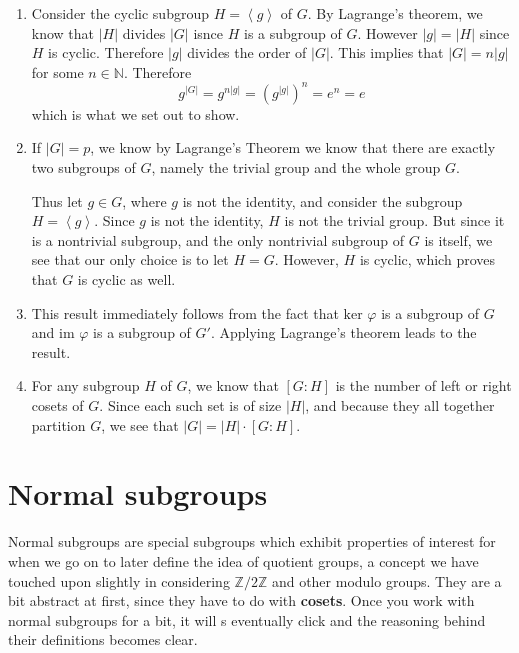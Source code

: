 \documentclass[12pt,letterpaper]{algebra_book}
\renewcommand{\phi}{\varphi}
\theoremstyle{definition}
\begin{document}
    \begin{prf}
        \begin{enumerate}
            \item Consider the cyclic subgroup $H = \left<g\right>$ of $G$. By
            Lagrange's theorem, we know that $|H|$ divides $|G|$ isnce
            $H$ is a subgroup of $G$. However $|g| = |H|$ since $H$ is
            cyclic. Therefore $|g|$ divides the order of $|G|$. This
            implies that $|G| = n|g|$ for some $n \in \mathbb{N}$.
            Therefore 
            \[
                g^{|G|} = g^{n|g|} = (g^{|g|})^n = e^n = e
            \]
            which is what we set out to show.

            \item If $|G| = p$, we know by Lagrange's Theorem we know
            that there are exactly two subgroups of $G$, namely the
            trivial group and the whole group $G$.

            Thus let $g \in G$, where $g$ is not the identity, 
            and consider the subgroup $H = \left< g
            \right>$. Since $g$ is not the identity, $H$ is not the
            trivial group. But since it is a nontrivial subgroup, and
            the only nontrivial subgroup of $G$ is itself, we see that our
            only choice is to let $H = G$. However, $H$ is cyclic,
            which proves that $G$ is cyclic as well.

            \item This result immediately follows from the fact that
            $\mbox{ker } \phi$ is a subgroup of $G$ and $\mbox{im }\phi$ is a
            subgroup of $G'$. Applying Lagrange's theorem leads to the
            result.
            
            \item For any subgroup $H$ of $G$, we know that $[G:H]$ is
            the number of left or right cosets of $G$. Since each such
            set is of size $|H|$, and because they all together
            partition $G$, we see that $|G| = |H| \cdot [G:H]$.
        \end{enumerate}
    \end{prf}
    \newpage
    \section{Normal subgroups}

    Normal subgroups are special subgroups which exhibit properties of
    interest for when we go on to later define the idea of quotient
    groups, a concept we have touched upon slightly in considering
    $\mathbb{Z}/2\mathbb{Z}$ and other modulo groups. They are a bit
    abstract at first, since they have to do with \textbf{cosets}.
    Once you work with normal subgroups for a bit, it will s
    eventually click and the reasoning behind their definitions
    becomes clear. 
\end{document}
